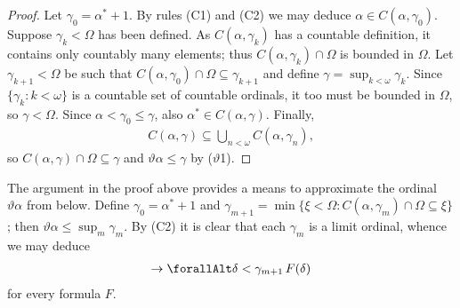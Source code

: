 \documentclass[UKenglish,cleveref,DIV=12]{scrartcl}
\let\forall\forallAlt
\theoremstyle{definition}
\theoremstyle{definition}
\begin{document}
\begin{proof}
 Let $\gamma_0=\alpha^*+1$. By rules (C1) and (C2) we may deduce $\alpha\in C(\alpha,\gamma_0)$. Suppose $\gamma_k<\Omega$ has been defined. As $C(\alpha,\gamma_k)$ has a countable definition, it contains only countably many elements; thus $C(\alpha,\gamma_k)\cap\Omega$ is bounded in $\Omega$. Let $\gamma_{k+1}<\Omega$ be such that $C(\alpha,\gamma_0)\cap\Omega\subseteq\gamma_{k+1}$ and define $\gamma=\sup_{k<\omega}\gamma_k$. Since $\{\gamma_k:k<\omega\}$ is a countable set of countable ordinals, it too must be bounded in $\Omega$, so $\gamma<\Omega$. Since $\alpha<\gamma_0\le\gamma$, also $\alpha^*\in C(\alpha,\gamma)$. Finally,
 \begin{align*}
  C(\alpha,\gamma)\subseteq\bigcup_{n<\omega}C(\alpha,\gamma_n),
 \end{align*}
 so $C(\alpha,\gamma)\cap\Omega\subseteq \gamma$ and $\vartheta\alpha\le\gamma$ by ($\vartheta$1).
\end{proof}

The argument in the proof above provides a means to approximate the ordinal $\vartheta\alpha$ from below. Define $\gamma_0=\alpha^*+1$ and $\gamma_{m+1}=\min\{\xi<\Omega:C(\alpha,\gamma_m)\cap\Omega\subseteq\xi\}$; then $\vartheta\alpha\le\sup_{m}\gamma_m$. By (C2) it is clear that each $\gamma_m$ is a limit ordinal, whence we may deduce
\begin{align*}
 [(\forall\delta\in C(\alpha,\gamma_m)\cap\Omega)\forall\xi<\delta\,F(\xi)]\rightarrow \forall\delta<\gamma_{m+1}\,F(\delta)
\end{align*}
for every formula $F$.
\end{document}
